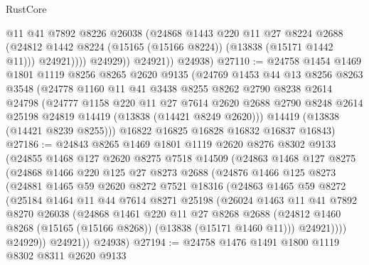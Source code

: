 \begin{lexlean}{RustCore}
\begin{coremodule}
                    @11
                    @41
                    @7892
                    @8226
                    @26038
                    (@24868
                      @1443
                      @220
                      @11
                      @27
                      @8224
                      @2688
                      (@24812 @1442 @8224 (@15165 (@15166 @8224)) (@13838 (@15171 @1442 @11)))
                      @24921))))
              @24929))
          @24921))
      @24938)
@27110 := @24758
    @1454
    @1469
    @1801
    @1119
    @8256
    @8265
    @2620
    @9135
    (@24769
      @1453
      @44
      @13
      @8256
      @8263
      @3548
      (@24778
        @1160
        @11
        @41
        @3438
        @8255
        @8262
        @2790
        @8238
        @2614
        @24798
        (@24777
          @1158
          @220
          @11
          @27
          @7614
          @2620
          @2688
          @2790
          @8248
          @2614
          @25198
          @24819
          @14419
          (@13838 (@14421 @8249 @2620)))
        @14419
        (@13838 (@14421 @8239 @8255)))
      @16822
      @16825
      @16828
      @16832
      @16837
      @16843)
@27186 := @24843
    @8265
    @1469
    @1801
    @1119
    @2620
    @8276
    @8302
    @9133
    (@24855
      @1468
      @127
      @2620
      @8275
      @7518
      @14509
      (@24863
        @1468
        @127
        @8275
        (@24868
          @1466
          @220
          @125
          @27
          @8273
          @2688
          (@24876
            @1466
            @125
            @8273
            (@24881
              @1465
              @59
              @2620
              @8272
              @7521
              @18316
              (@24863
                @1465
                @59
                @8272
                (@25184
                  @1464
                  @11
                  @44
                  @7614
                  @8271
                  @25198
                  (@26024
                    @1463
                    @11
                    @41
                    @7892
                    @8270
                    @26038
                    (@24868
                      @1461
                      @220
                      @11
                      @27
                      @8268
                      @2688
                      (@24812 @1460 @8268 (@15165 (@15166 @8268)) (@13838 (@15171 @1460 @11)))
                      @24921))))
              @24929))
          @24921))
      @24938)
@27194 := @24758 @1476 @1491 @1800 @1119 @8302 @8311 @2620 @9133

\end{coremodule}
\end{lexlean}
